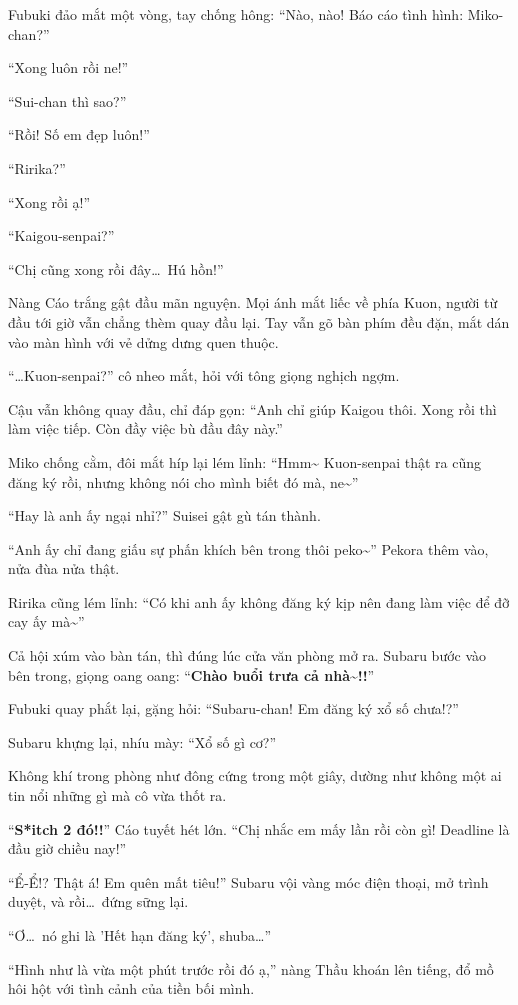 \documentclass[../main.tex]{subfiles}
\begin{document}
Fubuki đảo mắt một vòng, tay chống hông: ``Nào, nào! Báo cáo tình hình: Miko-chan?''

``Xong luôn rồi ne!''

``Sui-chan thì sao?''

``Rồi! Số em đẹp luôn!''

``Ririka?''

``Xong rồi ạ!''

``Kaigou-senpai?''

``Chị cũng xong rồi đây\dots\ Hú hồn!''

Nàng Cáo trắng gật đầu mãn nguyện. Mọi ánh mắt liếc về phía Kuon, người từ đầu tới giờ vẫn chẳng thèm quay đầu lại. Tay vẫn gõ bàn phím đều đặn, mắt dán vào màn hình với vẻ dửng dưng quen thuộc.

``\dots Kuon-senpai?'' cô nheo mắt, hỏi với tông giọng nghịch ngợm.

Cậu vẫn không quay đầu, chỉ đáp gọn: ``Anh chỉ giúp Kaigou thôi. Xong rồi thì làm việc tiếp. Còn đầy việc bù đầu đây này.''

Miko chống cằm, đôi mắt híp lại lém lỉnh: ``Hmm\~{} Kuon-senpai thật ra cũng đăng ký rồi, nhưng không nói cho mình biết đó mà, ne\~{}''

``Hay là anh ấy ngại nhỉ?'' Suisei gật gù tán thành.

``Anh ấy chỉ đang giấu sự phấn khích bên trong thôi peko\~{}'' Pekora thêm vào, nửa đùa nửa thật.

Ririka cũng lém lỉnh: ``Có khi anh ấy không đăng ký kịp nên đang làm việc để đỡ cay ấy mà\~{}''

Cả hội xúm vào bàn tán, thì đúng lúc cửa văn phòng mở ra. Subaru bước vào bên trong, giọng oang oang: ``\textbf{Chào buổi trưa cả nhà\~{}!!}''

Fubuki quay phắt lại, gặng hỏi: ``Subaru-chan! Em đăng ký xổ số chưa!?''

Subaru khựng lại, nhíu mày: ``Xổ số gì cơ?''

Không khí trong phòng như đông cứng trong một giây, dường như không một ai tin nổi những gì mà cô vừa thốt ra.

``\textbf{S*itch 2 đó!!}'' Cáo tuyết hét lớn. ``Chị nhắc em mấy lần rồi còn gì! Deadline là đầu giờ chiều nay!''

``Ể-Ể!? Thật á! Em quên mất tiêu!'' Subaru vội vàng móc điện thoại, mở trình duyệt, và rồi\dots\ đứng sững lại.

``Ơ\dots\ nó ghi là 'Hết hạn đăng ký', shuba\dots''

``Hình như là vừa một phút trước rồi đó ạ,'' nàng Thầu khoán lên tiếng, đổ mồ hôi hột với tình cảnh của tiền bối mình.
\end{document}
